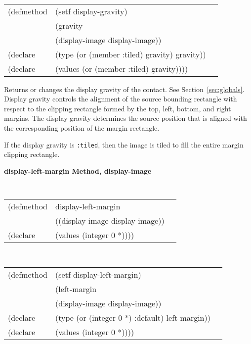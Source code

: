\begin{flushright} \parbox[t]{6.125in}{
\tt
\begin{tabular}{lll}
\raggedright
(defmethod & (setf display-gravity) & \\
         & (gravity \\
         & (display-image  display-image)) \\
(declare &(type (or (member :tiled) gravity)  gravity))\\
(declare & (values (or (member :tiled) gravity))))
\end{tabular}
\rm}
\end{flushright}

\begin{flushright} \parbox[t]{6.125in}{
Returns or changes the display gravity of the contact.
See Section~\ref{sec:globals}. Display gravity controls the alignment of the
source bounding rectangle with respect to the clipping rectangle formed by the
top, left, bottom, and right margins. The display gravity determines the source
position that is aligned with the corresponding position of the margin
rectangle. 

If the display gravity is {\tt :tiled}, then the image is tiled to fill the entire
margin clipping rectangle. } \end{flushright}

{\samepage  
{\large {\bf display-left-margin \hfill Method, display-image}}
\begin{flushright} \parbox[t]{6.125in}{
\tt
\begin{tabular}{lll}
\raggedright
(defmethod & display-left-margin & \\
& ((display-image  display-image)) \\
(declare & (values (integer 0 *))))
\end{tabular}
\rm

}\end{flushright}}

\begin{flushright} \parbox[t]{6.125in}{
\tt
\begin{tabular}{lll}
\raggedright
(defmethod & (setf display-left-margin) & \\
         & (left-margin \\
         & (display-image  display-image)) \\
(declare &(type (or (integer 0 *) :default)  left-margin))\\
(declare & (values (integer 0 *))))
\end{tabular}
\rm}
\end{flushright}

